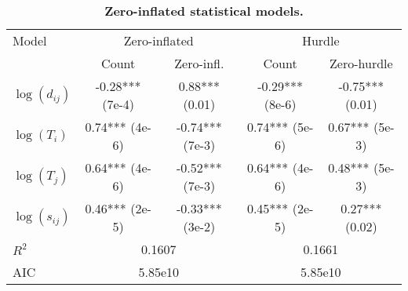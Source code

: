 

\begin{table}[!ht]
\begin{adjustwidth}{-1in}{0in}
\caption{{\bf Zero-inflated statistical models.}}
\medskip
\begin{tabular}{|l|c|c|c|c|}
\hline
Model  & \multicolumn{2}{|c|}{Zero-inflated} & \multicolumn{2}{|c|}{Hurdle} \\ 
 & Count & Zero-infl. & Count & Zero-hurdle \\
\hline
$\log(d_{ij})$ &    -0.28*** (7e-4) &   0.88*** (0.01)      &   -0.29*** (8e-6)   &  -0.75*** (0.01)    \\
$\log(T_i)$ & 0.74*** (4e-6)  & -0.74*** (7e-3)       &   0.74***  (5e-6)     &  0.67*** (5e-3)   \\
$\log(T_j)$ & 0.64*** (4e-6)  & -0.52*** (7e-3)      &    0.64***  (4e-6)     &  0.48*** (5e-3)    \\
$\log(s_{ij})$ & 0.46*** (2e-5)   &  -0.33*** (3e-2)  &  0.45*** (2e-5)       &  0.27*** (0.02)    \\
\hline
$R^2$ &   \multicolumn{2}{|c|}{0.1607}     &  \multicolumn{2}{|c|}{0.1661}  \\
AIC &     \multicolumn{2}{|c|}{5.85e10}    &   \multicolumn{2}{|c|}{5.85e10}  \\
\hline
\end{tabular}
\end{adjustwidth}
\end{table}

%
%
%

